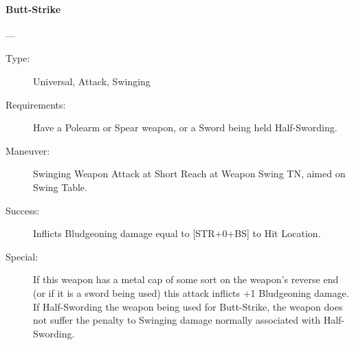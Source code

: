 \documentclass[oneside,11pt,english]{book}
\begin{document}
\paragraph{\large\label{man:Butt-Strike}Butt-Strike}---\quad{\large[X]}
\begin{description}
\item [Type:] Universal, Attack, Swinging 
\item [Requirements:] Have a Polearm or Spear weapon, or a Sword being held Half-Swording. 
\item [Maneuver:] Swinging Weapon Attack at Short Reach at Weapon Swing TN, aimed on Swing Table. 
\item [Success:] Inflicts Bludgeoning damage equal to [STR+0+BS] to Hit Location. 
\item [Special:] If this weapon has a metal cap of some sort on the weapon’s reverse end (or if it is a sword being used) this attack inflicts +1 Bludgeoning damage.  If Half-Swording the weapon being used for Butt-Strike, the weapon does not suffer the penalty to Swinging damage normally associated with Half-Swording. 
\end{description}
\end{document}
